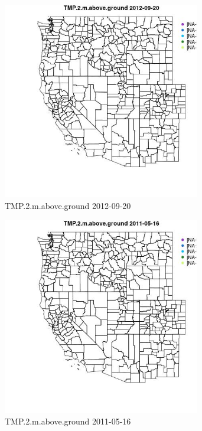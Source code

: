 \begin{figure} 
\centering  
\includegraphics[width=0.77\textwidth]{Code_Outputs/ML_input_report_ML_input_PM25_Step5_part_d_de_duplicated_aves_ML_input_MapObsTMP2maboveground2012-09-20.jpg} 
\caption{\label{fig:ML_input_report_ML_input_PM25_Step5_part_d_de_duplicated_aves_ML_inputMapObsTMP2maboveground2012-09-20}TMP.2.m.above.ground 2012-09-20} 
\end{figure} 
 

\clearpage 

\begin{figure} 
\centering  
\includegraphics[width=0.77\textwidth]{Code_Outputs/ML_input_report_ML_input_PM25_Step5_part_d_de_duplicated_aves_ML_input_MapObsTMP2maboveground2011-05-16.jpg} 
\caption{\label{fig:ML_input_report_ML_input_PM25_Step5_part_d_de_duplicated_aves_ML_inputMapObsTMP2maboveground2011-05-16}TMP.2.m.above.ground 2011-05-16} 
\end{figure} 
 

